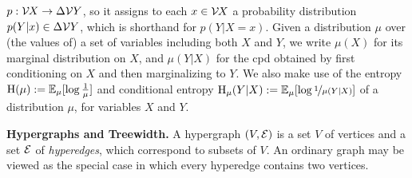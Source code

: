 \documentclass{article}
\begin{document}
$p : \mathcal V\mskip-1.5mu  X \to \Delta \mathcal V Y$, so it assigns to each $x \in \mathcal V\mskip-1.5mu X$ a
probability distribution $p(Y|x) \in \Delta \mathcal V Y$, which is shorthand for $p(Y|X\!\!=\!x)$.
Given a distribution $\mu$ over (the values of) a set of variables including both $X$ and $Y$,
we write $\mu(X)$ for its marginal distribution on $X$,
and $\mu(Y|X)$ for the cpd obtained by first conditioning on $X$ and then marginalizing to $Y$.
We also make use of the entropy $\operatorname{\mathrm{H}}(\mu) := \operatorname*{\mathbb{E}}_{\mu} [\log \frac1\mu]$ and conditional entropy $\operatorname{\mathrm{H}}_\mu(Y|X) := \operatorname*{\mathbb{E}}_\mu[\log\nicefrac1{\mu(Y|X)}]$ of a distribution $\mu$,
for variables $X$ and $Y$.



\textbf{Hypergraphs and Treewidth.} \label{sec:tw}
A hypergraph 
$
(V, \mathcal E)$ is a set $V$ of vertices and a
set
 $\mathcal E$ of \emph{hyperedges}, which correspond to subsets of $V$.
An ordinary graph may be viewed as the special case in which every hyperedge contains  two vertices.
\end{document}
